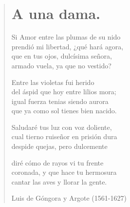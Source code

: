 \documentclass[12pt, twoside]{book}
\begin{document}
\newpage
\begin{verse}
\begin{center}
\section{A una dama.}
\end{center}
Si Amor entre las plumas de su nido\\
prendió mi libertad, ¿qué hará agora,\\
que en tus ojos, dulcísima señora,\\
armado vuela, ya que no vestido?
\newline

Entre las violetas fui herido\\
del áspid que hoy entre lilios mora;\\
igual fuerza tenias siendo aurora\\
que ya como sol tienes bien nacido.
\newline

Saludaré tus luz con voz doliente,\\
cual tierno ruiseñor en prisión dura\\
despide quejas, pero dulcemente
\newline

diré cómo de rayos vi tu frente\\
coronada, y que hace tu hermosura\\
cantar las aves y llorar la gente.
\newline

Luis de Góngora y Argote (1561-1627)
\end{verse}
\end{document}
